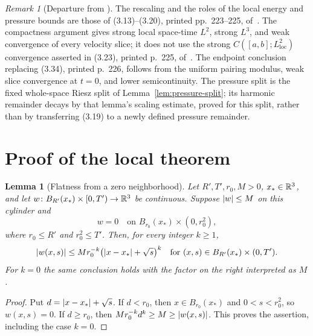 \documentclass[11pt,letterpaper]{article}
\numberwithin{equation}{section}
\theoremstyle{plain}
\newtheorem{lemma}[theorem]{Lemma}
\theoremstyle{definition}
\theoremstyle{remark}
\newtheorem{remark}[theorem]{Remark}
\begin{document}
\begin{remark}[Departure from \cite{ESS2003}]
The rescaling and the roles of the local energy and pressure bounds are those of (3.13)--(3.20), printed pp.~223--225, of~\cite{ESS2003}. The compactness argument gives strong local space-time \(L^2\), strong \(L^3\), and weak convergence of every velocity slice; it does not use the strong \(C([a,b];L^2_{\mathrm{loc}})\) convergence asserted in (3.23), printed p.~225, of~\cite{ESS2003}. The endpoint conclusion replacing (3.34), printed p.~226, follows from the uniform pairing modulus, weak slice convergence at \(t=0\), and lower semicontinuity. The pressure split is the fixed whole-space Riesz split of Lemma~\ref{lem:pressure-split}; its harmonic remainder decays by that lemma's scaling estimate, proved for this split, rather than by transferring (3.19) to a newly defined pressure remainder.
\end{remark}
\section{Proof of the local theorem}\label{sec:thm-local}

\begin{lemma}[Flatness from a zero neighborhood]\label{lem:flat-from-vanishing}
Let $R',T',r_0,M>0$, $x_\ast\in\mathbb{R}^3$, and let
$w\colon B_{R'}(x_\ast)\times[0,T')\to\mathbb{R}^3$ be continuous. Suppose
$\left\lvert w\right\rvert\le M$ on this cylinder and
\[
 w=0\quad\text{on }B_{r_0}(x_\ast)\times(0,r_0^2),
\]
where $r_0\le R'$ and $r_0^2\le T'$. Then, for every integer $k\ge1$,
\begin{equation}\label{eq:flat-from-vanishing}
 \left\lvert w(x,s)\right\rvert\le M r_0^{-k}
       \bigl(\left\lvert x-x_\ast\right\rvert+\sqrt{s}\bigr)^k
 \quad\text{for }(x,s)\in B_{R'}(x_\ast)\times(0,T').
\end{equation}
For $k=0$ the same conclusion holds with the factor on the right interpreted
as $M$.
\end{lemma}

\begin{proof}
Put $d=\left\lvert x-x_\ast\right\rvert+\sqrt{s}$. If $d<r_0$, then
$x\in B_{r_0}(x_\ast)$ and $0<s<r_0^2$, so $w(x,s)=0$. If $d\ge r_0$,
then $M r_0^{-k}d^k\ge M\ge\left\lvert w(x,s)\right\rvert$. This proves the assertion,
including the case $k=0$.
\end{proof}
\end{document}
